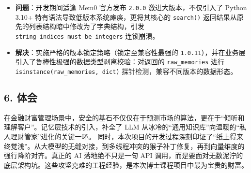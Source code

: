 \documentclass[
]{article}
\providecommand{\tightlist}{%
  \setlength{\itemsep}{0pt}\setlength{\parskip}{0pt}}
\begin{document}
\begin{enumerate}
  \begin{itemize}
  \tightlist
  \item
    \textbf{问题}：开发期间适逢 Mem0 官方发布 \texttt{2.0.0}
    激进大版本，不仅引入了 Python 3.10+
    特有语法导致低版本系统瘫痪，更将其核心的 \texttt{search()}
    返回结果从原先的列表结构暗中修改为了字典结构，引发
    \texttt{string\ indices\ must\ be\ integers} 连锁崩溃。
  \item
    \textbf{解决}：实施严格的版本锁定策略（锁定至兼容性最强的
    \texttt{1.0.11}），并在业务层引入了鲁棒性极强的数据类型剥离校验：对返回的
    \texttt{raw\_memories} 进行
    \texttt{isinstance(raw\_memories,\ dict)}
    探针检测，兼容不同版本的数据形态。
  \end{itemize}
\end{enumerate}

\subsection{6. 体会}\label{ux4f53ux4f1a}

在金融财富管理场景中，安全的基石不仅仅在于预测市场的算法，更在于``倾听和理解客户''。记忆层技术的引入，补全了
LLM 从冰冷的``通用知识库''向温暖的``私人理财管家''进化的关键一环。
同时，本次项目的开发过程深刻印证了``纸上得来终觉浅''。从大模型的无缝对接，到多线程冲突的猴子补丁修复，再到向量维度的强行降阶对齐。真正的
AI 落地绝不只是一句 API
调用，而是要面对无数泥泞的底层架构坑。这些攻坚克难的工程经验，是本次博士课程项目中最为宝贵的财富。
\end{document}
